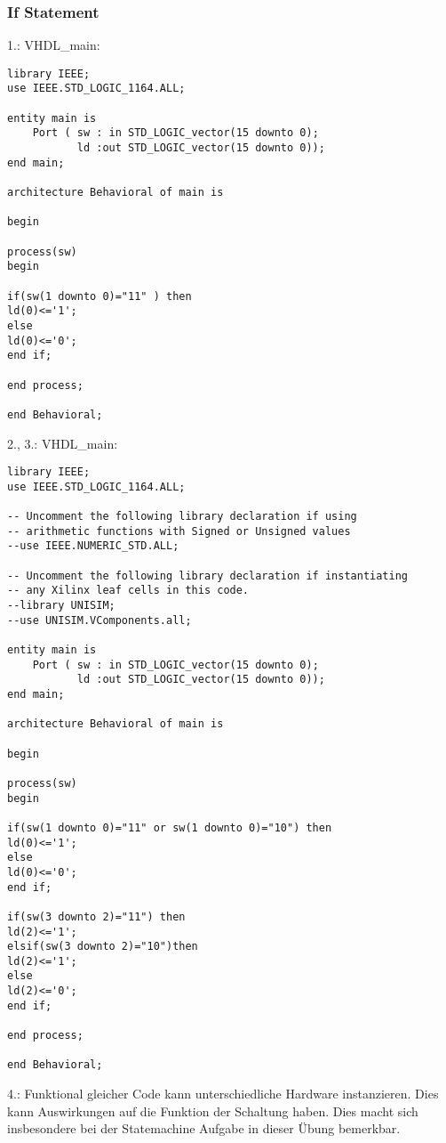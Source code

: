 \documentclass{article}
\begin{document}
\subsubsection{If Statement}
1.:\newline
VHDL\_main:\newline
\begin{verbatim}
library IEEE;
use IEEE.STD_LOGIC_1164.ALL;

entity main is
    Port ( sw : in STD_LOGIC_vector(15 downto 0);
           ld :out STD_LOGIC_vector(15 downto 0));
end main;

architecture Behavioral of main is

begin

process(sw)
begin

if(sw(1 downto 0)="11" ) then
ld(0)<='1';
else
ld(0)<='0';
end if;

end process;

end Behavioral;
\end{verbatim}
2., 3.: \newline
VHDL\_main:\newline
\begin{verbatim}
library IEEE;
use IEEE.STD_LOGIC_1164.ALL;

-- Uncomment the following library declaration if using
-- arithmetic functions with Signed or Unsigned values
--use IEEE.NUMERIC_STD.ALL;

-- Uncomment the following library declaration if instantiating
-- any Xilinx leaf cells in this code.
--library UNISIM;
--use UNISIM.VComponents.all;

entity main is
    Port ( sw : in STD_LOGIC_vector(15 downto 0);
           ld :out STD_LOGIC_vector(15 downto 0));
end main;

architecture Behavioral of main is

begin

process(sw)
begin

if(sw(1 downto 0)="11" or sw(1 downto 0)="10") then
ld(0)<='1';
else
ld(0)<='0';
end if;

if(sw(3 downto 2)="11") then
ld(2)<='1';
elsif(sw(3 downto 2)="10")then
ld(2)<='1';
else
ld(2)<='0';
end if;

end process;

end Behavioral;
\end{verbatim}
4.: Funktional gleicher Code kann unterschiedliche Hardware instanzieren. Dies kann Auswirkungen auf die Funktion der Schaltung haben. Dies macht sich insbesondere bei der Statemachine Aufgabe in dieser \"Ubung bemerkbar.
\end{document}
